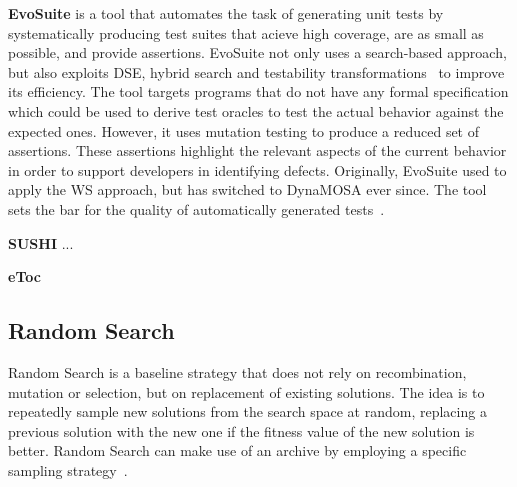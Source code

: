 \documentclass{article}
\begin{document}
\textbf{EvoSuite} is a tool that automates the task of generating unit tests by systematically producing test suites that acieve high coverage, are as small as possible, and provide assertions. EvoSuite not only uses a search-based approach,  but also exploits \ac{DSE}, hybrid search and testability transformations~\cite{1265732} to improve its efficiency. The tool targets programs that do not have any formal specification which could be used to derive test oracles to test the actual behavior against the expected ones. However, it uses mutation testing to produce a reduced set of assertions. These assertions highlight the relevant aspects of the current behavior in order to support developers in identifying defects. Originally, EvoSuite used to apply the \ac{WS} approach, but has switched to \ac{DynaMOSA} ever since. The tool sets the bar for the quality of automatically generated tests~\cite{Vogl2021,Panichella2020,Campos2019,Fraser2018,Fraser2016,Fraser2017}.

\textbf{SUSHI} ...

\textbf{eToc}

\subsection{Random Search}

Random Search is a baseline strategy that does not rely on recombination, mutation or selection, but on replacement of existing solutions. The idea is to repeatedly sample new solutions from the search space at random, replacing a previous solution with the new one if the fitness value of the new solution is better. Random Search can make use of an archive by employing a specific sampling strategy~\cite{Campos2017}.

\end{document}
